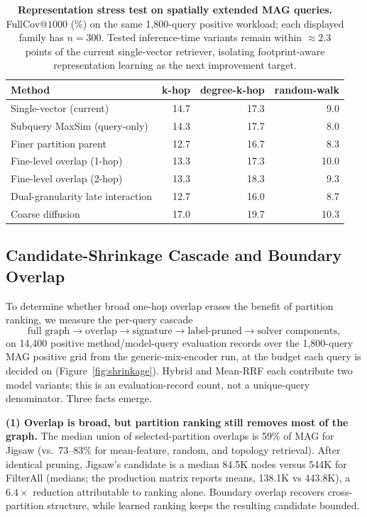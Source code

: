\documentclass[runningheads]{llncs}
\begin{document}
\begin{table}[H]
\centering
\caption{\textbf{Representation stress test on spatially extended MAG queries.} FullCov@$1000$ (\%) on the same 1,800-query positive workload; each displayed family has $n{=}300$. Tested inference-time variants remain within ${\approx}2.3$ points of the current single-vector retriever, isolating footprint-aware representation learning as the next improvement target.}
\label{tab:probes}
\small
\setlength{\tabcolsep}{5pt}
\begin{tabular}{lrrr}
\toprule
\textbf{Method} & \textbf{k-hop} & \textbf{degree-k-hop} & \textbf{random-walk} \\
\midrule
Single-vector (current)            & 14.7 & 17.3 & 9.0 \\
Subquery MaxSim (query-only)       & 14.3 & 17.7 & 8.0 \\
Finer partition parent             & 12.7 & 16.7 & 8.3 \\
Fine-level overlap (1-hop)         & 13.3 & 17.3 & 10.0 \\
Fine-level overlap (2-hop)         & 13.3 & 18.3 & 9.3 \\
Dual-granularity late interaction  & 12.7 & 16.0 & 8.7 \\
Coarse diffusion                   & 17.0 & 19.7 & 10.3 \\
\bottomrule
\end{tabular}
\end{table}

\subsection{Candidate-Shrinkage Cascade and Boundary Overlap}
\label{sec:shrinkage}

To determine whether broad one-hop overlap erases the benefit of partition ranking, we measure the per-query cascade
\[
\text{full graph} \to \text{overlap} \to \text{signature} \to \text{label-pruned} \to \text{solver components},
\]
on 14{,}400 positive method/model-query evaluation records over the 1{,}800-query MAG positive grid from the generic-mix-encoder run, at the budget each query is decided on (Figure~\ref{fig:shrinkage}). Hybrid and Mean-RRF each contribute two model variants; this is an evaluation-record count, not a unique-query denominator. Three facts emerge.

\textbf{(1) Overlap is broad, but partition ranking still removes most of the graph.} The median union of selected-partition overlaps is 59\% of MAG for Jigsaw (vs.\ 73--83\% for mean-feature, random, and topology retrieval). After identical pruning, Jigsaw's candidate is a median 84.5K nodes versus 544K for FilterAll (medians; the production matrix reports means, 138.1K vs 443.8K), a $6.4\times$ reduction attributable to ranking alone. Boundary overlap recovers cross-partition structure, while learned ranking keeps the resulting candidate bounded.
\end{document}
